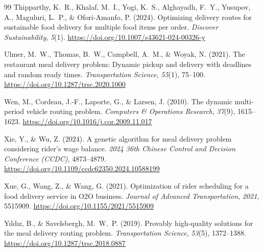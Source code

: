 \documentclass[12pt,a4paper]{report}
\begin{document}
\begin{thebibliography}{99}
Thipparthy, K.~R., Khalaf, M.~I., Yogi, K.~S., Alghayadh, F.~Y., Yusupov, A., Maguluri, L.~P., \& Ofori-Amanfo, P. (2024).
\newblock Optimizing delivery routes for sustainable food delivery for multiple food items per order.
\newblock \textit{Discover Sustainability}, \textit{5}(1).
\newblock \url{https://doi.org/10.1007/s43621-024-00326-y}

Ulmer, M.~W., Thomas, B.~W., Campbell, A.~M., \& Woyak, N. (2021).
\newblock The restaurant meal delivery problem: Dynamic pickup and delivery with deadlines and random ready times.
\newblock \textit{Transportation Science}, \textit{55}(1), 75--100.
\newblock \url{https://doi.org/10.1287/trsc.2020.1000}

Wen, M., Cordeau, J.-F., Laporte, G., \& Larsen, J. (2010).
\newblock The dynamic multi-period vehicle routing problem.
\newblock \textit{Computers \& Operations Research}, \textit{37}(9), 1615--1623.
\newblock \url{https://doi.org/10.1016/j.cor.2009.11.017}

Xie, Y., \& Wu, Z. (2024).
\newblock A genetic algorithm for meal delivery problem considering rider's wage balance.
\newblock \textit{2024 36th Chinese Control and Decision Conference (CCDC)},
  4873--4879.
\newblock \url{https://doi.org/10.1109/ccdc62350.2024.10588199}

Xue, G., Wang, Z., \& Wang, G. (2021).
\newblock Optimization of rider scheduling for a food delivery service in {O2O} business.
\newblock \textit{Journal of Advanced Transportation}, \textit{2021}, 5515909.
\newblock \url{https://doi.org/10.1155/2021/5515909}

Y{\i}ld{\i}z, B., \& Savelsbergh, M.~W.~P. (2019).
\newblock Provably high-quality solutions for the meal delivery routing problem.
\newblock \textit{Transportation Science}, \textit{53}(5), 1372--1388.
\newblock \url{https://doi.org/10.1287/trsc.2018.0887}

\end{thebibliography}
\end{document}
